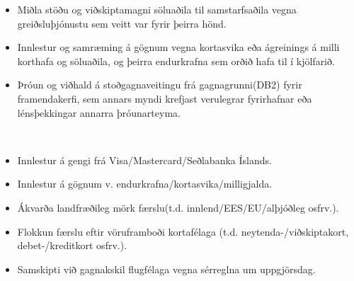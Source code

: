 \documentclass[a4paper,10pt]{article}
\begin{document}
{\begin{description}[
		leftmargin=1em,
		labelwidth=0pt,
		itemindent=0pt,
		listparindent=0pt,
		parsep=0.1cm,    %
		itemsep=0.1cm    %
	  ]
\begin{itemize}[leftmargin=1em, topsep=0pt]
			      \item Miðla stöðu og viðskiptamagni söluaðila til samstarfsaðila vegna greiðsluþjónustu sem veitt var fyrir þeirra hönd.
			      \item Innlestur og samræming á gögnum vegna kortasvika eða ágreinings á milli korthafa og söluaðila, og þeirra endurkrafna sem orðið hafa til í kjölfarið.
			      \item Þróun og viðhald á stoðgagnaveitingu frá gagnagrunni(DB2) fyrir framendakerfi, sem annars myndi krefjast verulegrar fyrirhafnar eða lénsþekkingar annarra þróunarteyma.
		      \end{itemize}
		      \newpage
		\item[\textbf{Stoðþjónustur}]\mbox{}\\
		      \vspace{-0.4cm}
		      \begin{itemize}[leftmargin=1em, topsep=0pt]
			      \item Innlestur á gengi frá Visa/Mastercard/Seðlabanka Íslands.
			      \item Innlestur á gögnum v. endurkrafna/kortasvika/milligjalda.
			      \item Ákvarða landfræðileg mörk færslu(t.d. innlend/EES/EU/alþjóðleg osfrv.).
			      \item Flokkun færslu eftir vöruframboði kortafélaga (t.d. neytenda-/viðskiptakort, debet-/kreditkort osfrv.).
			      \item Samskipti við gagnakskil flugfélaga vegna sérreglna um uppgjörsdag.
		      \end{itemize}
	\end{description}
}
\end{document}
